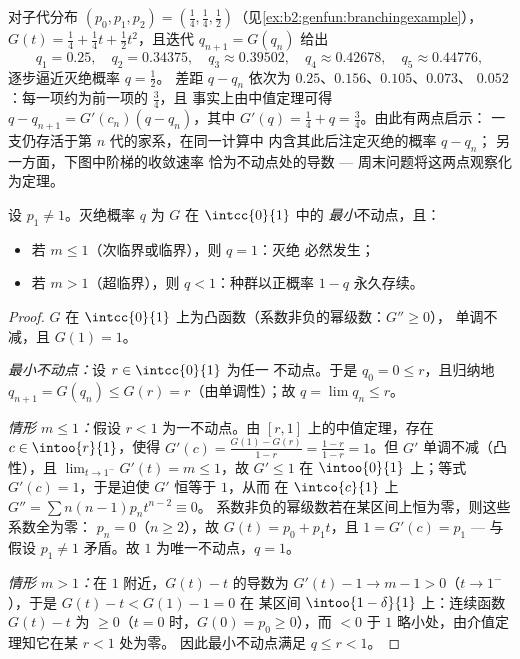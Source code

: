 \begin{example}[观察灭绝概率的收敛]
\label{ex:b2:genfun:cobwebnumerics}
对子代分布 $(p_0, p_1, p_2) = (\tfrac14,
\tfrac14, \tfrac12)$（见\cref{ex:b2:genfun:branchingexample}），
$G(t) = \tfrac14 + \tfrac14t + \tfrac12t^2$，且迭代
$q_{n+1} = G(q_n)$ 给出
\[
q_1 = 0.25, \quad q_2 = 0.34375, \quad q_3 \approx 0.39502,
\quad q_4 \approx 0.42678, \quad q_5 \approx 0.44776,
\]
逐步逼近灭绝概率 $q = \tfrac12$。
差距 $q - q_n$ 依次为 $0.25$、$0.156$、$0.105$、$0.073$、
$0.052$：每一项约为前一项的 $\tfrac34$，且
事实上由中值定理可得 $q - q_{n+1} = G'(c_n)(q
- q_n)$，其中 $G'(q) = \tfrac14 + q = \tfrac34$。由此有两点启示：
一支仍存活于第 $n$ 代的家系，在同一计算中
内含其此后注定灭绝的概率 $q - q_n$；
另一方面，下图中阶梯的收敛速率
恰为不动点处的导数 ---
周末问题将这两点观察化为定理。
\end{example}

\begin{theorem}[灭绝判别准则]\label{thm:b2:genfun:extinction}
设 $p_1 \neq 1$。灭绝概率 $q$ 为 $G$ 在 $\intcc{0}{1}$ 中的
\emph{最小}不动点，且：
\begin{itemize}
\item 若 $m \leq 1$（次临界或临界），则 $q = 1$：灭绝
必然发生；
\item 若 $m > 1$（超临界），则 $q < 1$：种群以正概率
$1 - q$ 永久存续。
\end{itemize}
\end{theorem}

\begin{proof}
$G$ 在 $\intcc{0}{1}$ 上为凸函数（系数非负的幂级数：$G'' \geq 0$），
单调不减，且 $G(1) = 1$。

\emph{最小不动点：}设 $r \in \intcc{0}{1}$ 为任一
不动点。于是 $q_0 = 0 \leq r$，且归纳地 $q_{n+1} = G(q_n)
\leq G(r) = r$（由单调性）；故 $q = \lim q_n \leq r$。

\emph{情形 $m \leq 1$：}假设 $r < 1$ 为一不动点。由
$[r, 1]$ 上的中值定理，存在 $c \in \intoo{r}{1}$，使得
$G'(c) = \frac{G(1) - G(r)}{1 - r} = \frac{1 - r}{1 - r} = 1$。但
$G'$ 单调不减（凸性），且 $\lim_{t\to1^-}G'(t) = m
\leq 1$，故 $G' \leq 1$ 在 $\intoo{0}{1}$ 上；等式 $G'(c) =
1$，于是迫使 $G'$ 恒等于 $1$，从而
在 $\intco{c}{1}$ 上 $G'' = \sum n(n-1)p_nt^{n-2} \equiv 0$。
系数非负的幂级数若在某区间上恒为零，则这些系数全为零：
$p_n = 0$（$n \geq 2$），故 $G(t) = p_0
+ p_1t$，且 $1 = G'(c) = p_1$ --- 与假设
$p_1 \neq 1$ 矛盾。故 $1$ 为唯一不动点，$q = 1$。

\emph{情形 $m > 1$：}在 $1$ 附近，$G(t) - t$ 的导数为 $G'(t) -
1 \to m - 1 > 0$（$t \to 1^-$），于是 $G(t) - t < G(1) - 1 = 0$ 在
某区间 $\intoo{1 - \delta}{1}$ 上：连续函数
$G(t) - t$ 为 $\geq 0$（$t = 0$ 时，$G(0) = p_0 \geq 0$），而 $< 0$
于 $1$ 略小处，由介值定理知它在某 $r < 1$ 处为零。
因此最小不动点满足 $q \leq r < 1$。
\end{proof}

